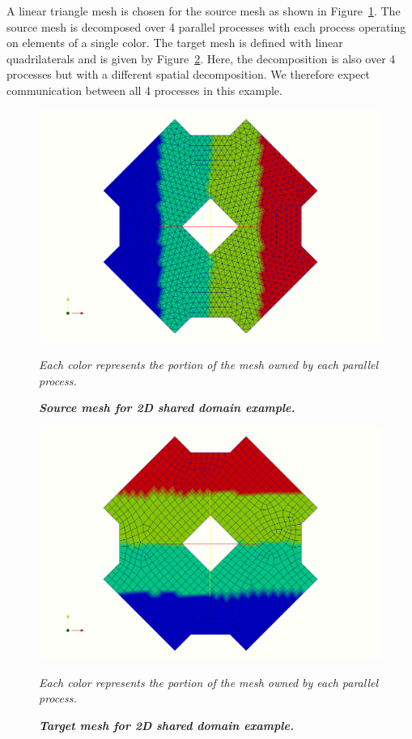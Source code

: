 \documentclass[letterpaper,12pt]{article}
\begin{document}
A linear triangle mesh is chosen for the source mesh as shown in
Figure~\ref{fig:source_mesh}. The source mesh is decomposed over 4
parallel processes with each process operating on elements of a single
color. The target mesh is defined with linear quadrilaterals and is
given by Figure~\ref{fig:target_mesh}. Here, the decomposition is also
over 4 processes but with a different spatial decomposition. We
therefore expect communication between all 4 processes in this
example.

\begin{figure}[htpb!]
  \centering \includegraphics[width=5.5in]{tri_part.png}
  \caption{\bf \sl Source mesh for 2D shared domain example.}{\sl Each
    color represents the portion of the mesh owned by each parallel
    process.}
  \label{fig:source_mesh}
\end{figure}

\begin{figure}[htpb!]
  \centering \includegraphics[width=5.5in]{quad_part.png}
  \caption{\bf \sl Target mesh for 2D shared domain example.}{\sl Each
    color represents the portion of the mesh owned by each parallel
    process.}
  \label{fig:target_mesh}
\end{figure}
 
\end{document}
